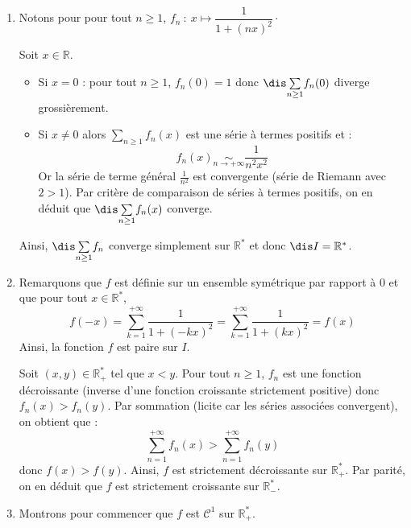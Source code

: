 \documentclass[a4paper,10pt]{report}
\newcommand{\Sum}[2]{\ensuremath{\textstyle{\sum\limits_{#1}^{#2}}}}
\begin{document}
\corr \begin{enumerate}
\item  Notons pour pour tout $n \geq 1$, $f_n\ :\ x\mapsto \dfrac{1}{1+(nx)^2} \cdot$

\medskip

\noindent Soit $x \in \mathbb{R}$.

\begin{itemize}
\item Si $x=0$ : pour tout $n \geq 1$, $f_n(0)=1$ donc $\dis \Sum{n \geq 1}{} f_n(0)$ diverge grossièrement.
\item Si $x \neq 0$ alors $\Sum{n \geq 1}{} f_n(x)$ est une série à termes positifs et :
$$ f_n(x) \underset{n \rightarrow + \infty}{\sim} \frac{1}{n^2x^2}$$
Or la série de terme général $\frac{1}{n^2}$ est convergente (série de Riemann avec $2>1$). Par critère de comparaison de séries à termes positifs, on en déduit que $\dis \Sum{n \geq 1}{} f_n(x)$ converge.
\end{itemize}
Ainsi, $\dis \Sum{n \geq 1}{} f_n$ converge simplement sur $\mathbb{R}^*$ et donc $\dis I = \mathbb{R}^*$.

\item Remarquons que $f$ est définie sur un ensemble symétrique par rapport à $0$ et que pour tout $x \in \mathbb{R}^*$,
$$ f(-x) = \sum_{k=1}^{+ \infty} \frac{1}{1+(-kx)^2} = \sum_{k=1}^{+ \infty} \frac{1}{1+(kx)^2} = f(x)$$
Ainsi, la fonction $f$ est paire sur $I$.

\medskip

\noindent Soit $(x,y) \in \mathbb{R}_+^{*}$ tel que $x<y$. Pour tout $n \geq 1$, $f_n$ est une fonction décroissante (inverse d'une fonction croissante strictement positive) donc $f_n(x)>f_n(y)$. Par sommation (licite car les séries associées convergent), on obtient que :
$$ \sum_{n=1}^{+ \infty} f_n(x) >  \sum_{n=1}^{+ \infty} f_n(y)$$
donc $f(x) > f(y)$. Ainsi, $f$ est strictement décroissante sur $\mathbb{R}_+^{*}$.
Par parité, on en déduit que $f$ est strictement croissante sur $\mathbb{R}_{-}^{*}$.
\item Montrons pour commencer que $f$ est $\mathcal{C}^1$ sur $\mathbb{R}_+^{*}$.


\end{enumerate}
\end{document}
